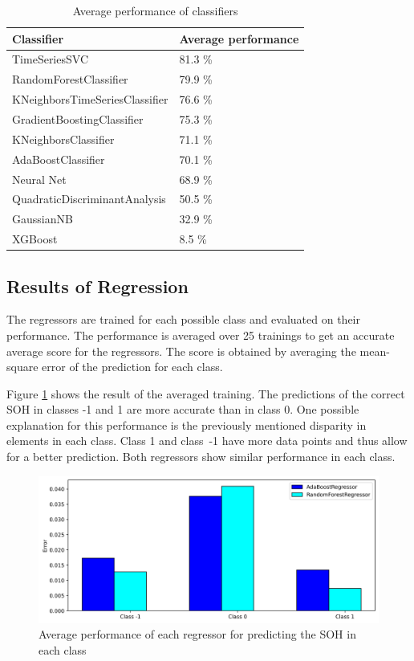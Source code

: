 \begin{table}
	\begin{center}
		\begin{tabular}{|| l | l ||}
			\hline
			\rule{0pt}{2ex}Classifier & Average performance\\
			\hline
			\hline
			\rule{0pt}{2ex}TimeSeriesSVC & 81.3 \%\\	\hline
			RandomForestClassifier & 79.9 \% \\ \hline
			KNeighborsTimeSeriesClassifier & 76.6 \%\\ \hline
			GradientBoostingClassifier & 75.3 \%\\ \hline
			KNeighborsClassifier & 71.1 \%\\ \hline
			AdaBoostClassifier & 70.1 \% \\ \hline
			Neural Net & 68.9 \% \\ \hline
			QuadraticDiscriminantAnalysis & 50.5 \% \\ \hline
			GaussianNB & 32.9 \% \\ \hline
			XGBoost & 8.5 \% \\ \hline
			\hline
		\end{tabular}
		\caption{Average performance of classifiers}
		\label{score}
	\end{center}
	\vspace{-4mm}
\end{table}
\newpage
\subsection{Results of Regression}

The regressors are trained for each possible class and evaluated on their performance. The performance is averaged over 25 trainings to get an accurate average score for the regressors. The score is obtained by averaging the mean-square error of the prediction for each class.

Figure \ref{fig:avgperf_reg} shows the result of the averaged training. The predictions of the correct SOH in classes -1 and 1 are more accurate than in class 0. One possible explanation for this performance is the previously mentioned disparity in elements in each class. Class 1 and class~-1 have more data points and thus allow for a better prediction. Both regressors show similar performance in each class.

\begin{figure}[H]
	\centering
	\includegraphics[width=1\linewidth]{IMGs/Average_performance_REG.png}
	\caption{Average performance of each regressor for predicting the SOH in each class}
	\label{fig:avgperf_reg}
\end{figure}
